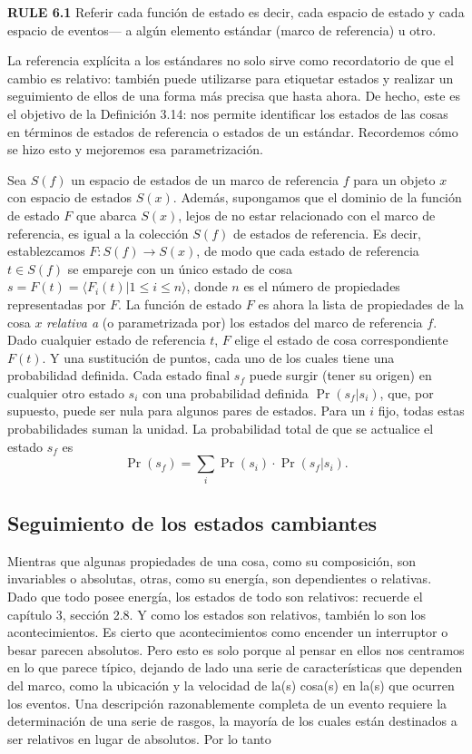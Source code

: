 \begin{justifying}
\textbf{RULE 6.1} Referir cada función de estado es decir, cada espacio de estado y cada espacio de eventos— a algún elemento estándar (marco de referencia) u otro.

La referencia explícita a los estándares no solo sirve como recordatorio de que el cambio es relativo: también puede utilizarse para etiquetar estados y realizar un seguimiento de ellos de una forma más precisa que hasta ahora. De hecho, este es el objetivo de la Definición 3.14: nos permite identificar los estados de las cosas en términos de estados de referencia o estados de un estándar. Recordemos cómo se hizo esto y mejoremos esa parametrización.

Sea $S(f)$ un espacio de estados de un marco de referencia $f$ para un objeto $x$ con espacio de estados $S(x)$. Además, supongamos que el dominio de la función de estado $F$ que abarca $S(x)$, lejos de no estar relacionado con el marco de referencia, es igual a la colección $S(f)$ de estados de referencia. Es decir, establezcamos $F: S(f) \to S(x)$, de modo que cada estado de referencia $t \in S(f)$ se empareje con un único estado de cosa $s=F(t) = \langle F_i(t)| 1 \le i \le n \rangle$, donde $n$ es el número de propiedades representadas por $F$. La función de estado $F$ es ahora la lista de propiedades de la cosa $x$ \textit{relativa a} (o parametrizada por) los estados del marco de referencia $f$. Dado cualquier estado de referencia $t$, $F$ elige el estado de cosa correspondiente $F(t)$. Y una sustitución de
puntos, cada uno de los cuales tiene una probabilidad definida. Cada estado final
 $s_f$ puede surgir (tener su origen) en cualquier otro estado $s_i$ con una probabilidad definida $\Pr(s_f|s_i)$, que, por supuesto, puede ser nula para algunos pares de estados. Para un $i$ fijo, todas estas probabilidades suman la unidad. La probabilidad total de que se actualice el estado $s_f$ es
\[
\Pr(s_f) = \sum_i \Pr(s_i) \cdot \Pr(s_f|s_i).
\]

\subsection*{Seguimiento de los estados cambiantes}

Mientras que algunas propiedades de una cosa, como su composición, son invariables o absolutas, otras, como su energía, son
dependientes o relativas. Dado que todo posee energía, los estados de todo son relativos: recuerde el capítulo 3, sección 2.8. Y como los estados son
relativos, también lo son los acontecimientos. Es cierto que acontecimientos como encender un interruptor o besar
parecen absolutos. Pero esto es solo porque al pensar en ellos nos centramos en lo que parece típico, dejando de lado una serie de características que dependen del marco, como la ubicación y la velocidad de la(s) cosa(s) en la(s) que ocurren los eventos. Una descripción razonablemente completa de un evento requiere la determinación de una serie de rasgos, la mayoría de los cuales están destinados a ser relativos en lugar de absolutos. Por lo tanto


\end{justifying}

